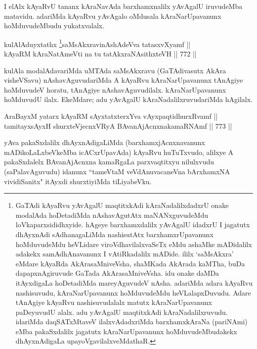 \begin{artha} 
I elAlx kAyaRvU tananx kAraNavAda barxhamxnalilx yAvAgalU iruvudeMba 
matavidu. adariMda kAyaRvu yAvAgalo oMdusala kAraNarUpavanunx 
hoMduvudeMbudu yukatxvalalx.
\end{artha}


\begin{shl}
kulAlAduyxtathx \footnote{GaTAdi kAyaRvu yAvAgalU maqtitxkAdi kAraNadalilxdadxrU 
onake modalAda hoDetadiMda nAshavAgutAtx maNANxguvudeMdu 
loVkaparxsididhxyide. hAgeye barxhamxdalilx yAvAgalU idadxrU I 
jagatutx dhAyxnAdi sAdhanagaLiMda nashisutAtx barxhamxrUpavanunx 
hoMduvudeMdu heVLidare viroVdhavilalxvaSeTx eMdu \ndash  ashaMke mADidalilx 
adakekx samAdhAnavanunx I vAtiRkadalilx mADide. ililx `saMsAkxra' 
eMdare kAyaRda AkArasaMniveVsha, shaMKada AkArada kaMTha, buDa 
dapapxnAgiruvude GaTada AkArasaMniveVsha. idu onake daMDa itAyxdigaLa 
hoDetadiMda mareyAguvudeV nAsha. adariMda adara kAyaRvu nashisuvudu, 
kAraNarUpavanunx hoMduvudeMdu heVLalapxDuvudu. Adare tAnAgiye kAyaRvu 
nashisuvudalalx matutx kAraNarUpavanunx paDeyuvudU alalx. adu yAvAgalU 
maqtitxkAdi kAraNadalilxruvudu. idariMda daqSATxMtaveV 
ilalxvAdadxriMda barxhamxkAraNa (pariNAmi) eMba pakaSxdalilx jagatutx 
kAraNarUpavanunx hoMduvudeMbudakekx dhAyxnAdigaLa 
upayoVgavilalxveMdathaR.}saMsAkxravinAshAdeVva tatasxvXyamf || \\
kAyaRM kAraNatAmeVti na tu tatAkxraNAsithxteVH \hfill || 772 ||  
\end{shl}

\begin{artha} 
kulAla modalAdavariMda uMTAda saMsAkxravu (GaTAdivasutx AkAra 
visheVSavu) nAshavAguvudariMda A kAyaRvu kAraNarUpavanunx tAnAgiye 
hoMduvudeV horatu, tAnAgiye nAshavAguvudilalx. kAraNarUpavanunx 
hoMduvudU ilalx. EkeMdare; adu yAvAgalU kAraNadalilxruvudariMda 
hAgilalx.
\end{artha}


\begin{shl}
AraBayxM yatarx kAyaRM sAyxtatxterxYva vAyxpaqtidhurxRvamf || \\
tamitayxsAyxH shurxteVjecnxVRyA BAvanAjAcnxnakamaRNAmf \hfill || 773 ||  
\end{shl}

\begin{artha} 
yAva pakaSxdalilx dhAyxnAdigaLiMda (barxhamxjAcnxnavanunx mADikoLaLxbeVkeMba icACxrUpavAda) kAyaRvu huTuTxvudo, alilxye A pakaSxdalelx BAvanAjAcnxna kamaRgaLa parxvaqtitxyu nilulxvudu (saPalavAguvudu) idanunx ``tameVtaM veVdAnuvacaneVna bArxhamxNA vividiSanitx" itAyxdi shurxtiyiMda tiLiyabeVku.
\end{artha}

